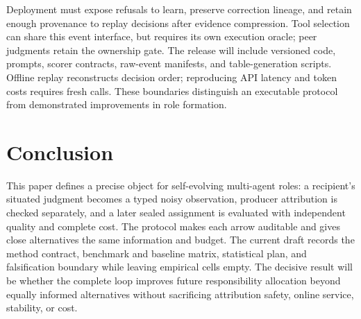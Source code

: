 \documentclass[sigconf,anonymous]{aamas}
\begin{document}
Deployment must expose refusals to learn, preserve correction lineage, and retain enough provenance to replay decisions after evidence compression. Tool selection can share this event interface, but requires its own execution oracle; peer judgments retain the ownership gate. The release will include versioned code, prompts, scorer contracts, raw-event manifests, and table-generation scripts. Offline replay reconstructs decision order; reproducing API latency and token costs requires fresh calls. These boundaries distinguish an executable protocol from demonstrated improvements in role formation.

\section{Conclusion}

This paper defines a precise object for self-evolving multi-agent roles: a recipient's situated judgment becomes a typed noisy observation, producer attribution is checked separately, and a later sealed assignment is evaluated with independent quality and complete cost. The protocol makes each arrow auditable and gives close alternatives the same information and budget. The current draft records the method contract, benchmark and baseline matrix, statistical plan, and falsification boundary while leaving empirical cells empty. The decisive result will be whether the complete loop improves future responsibility allocation beyond equally informed alternatives without sacrificing attribution safety, online service, stability, or cost.

\clearpage


\end{document}
